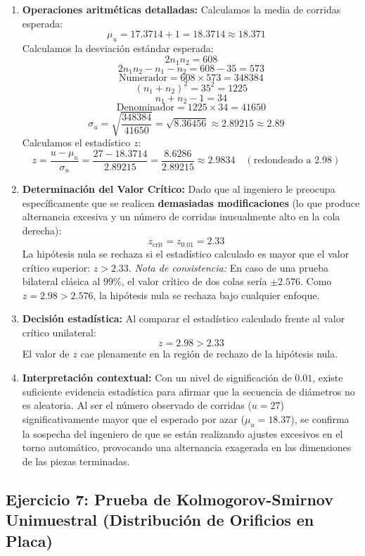 \documentclass[11pt,a4paper]{article}
\begin{document}
\begin{enumerate}
    \item \textbf{Operaciones aritméticas detalladas:}
    Calculamos la media de corridas esperada:
    \[ \mu_u = 17.3714 + 1 = 18.3714 \approx 18.371 \quad \]
    Calculamos la desviación estándar esperada:
    \[ 2 n_1 n_2 = 608 \]
    \[ 2 n_1 n_2 - n_1 - n_2 = 608 - 35 = 573 \]
    \[ \text{Numerador} = 608 \times 573 = 348384 \]
    \[ (n_1 + n_2)^2 = 35^2 = 1225 \]
    \[ n_1 + n_2 - 1 = 34 \]
    \[ \text{Denominador} = 1225 \times 34 = 41650 \]
    \[ \sigma_u = \sqrt{\frac{348384}{41650}} = \sqrt{8.36456} \approx 2.89215 \approx 2.89 \quad \]
    Calculamos el estadístico $z$:
    \[ z = \frac{u - \mu_u}{\sigma_u} = \frac{27 - 18.3714}{2.89215} = \frac{8.6286}{2.89215} \approx 2.9834 \quad (\text{redondeado a } 2.98) \quad \]

    \item \textbf{Determinación del Valor Crítico:}
    Dado que al ingeniero le preocupa específicamente que se realicen \textbf{demasiadas modificaciones} (lo que produce alternancia excesiva y un número de corridas inusualmente alto en la cola derecha):
    \[ z_{\text{crit}} = z_{0.01} = 2.33 \quad \]
    La hipótesis nula se rechaza si el estadístico calculado es mayor que el valor crítico superior: $z > 2.33$.
    \textit{Nota de consistencia:} En caso de una prueba bilateral clásica al $99\%$, el valor crítico de dos colas sería $\pm 2.576$. Como $z = 2.98 > 2.576$, la hipótesis nula se rechaza bajo cualquier enfoque.

    \item \textbf{Decisión estadística:}
    Al comparar el estadístico calculado frente al valor crítico unilateral:
    \[ z = 2.98 > 2.33 \]
    El valor de $z$ cae plenamente en la región de rechazo de la hipótesis nula.

    \item \textbf{Interpretación contextual:}
    Con un nivel de significación de $0.01$, existe suficiente evidencia estadística para afirmar que la secuencia de diámetros no es aleatoria. Al ser el número observado de corridas ($u=27$) significativamente mayor que el esperado por azar ($\mu_u = 18.37$), se confirma la sospecha del ingeniero de que se están realizando ajustes excesivos en el torno automático, provocando una alternancia exagerada en las dimensiones de las piezas terminadas.

\end{enumerate}

\newpage
\subsection{Ejercicio 7: Prueba de Kolmogorov-Smirnov Unimuestral (Distribución de Orificios en Placa)} \label{ej:kolmo_uni}
\end{document}
